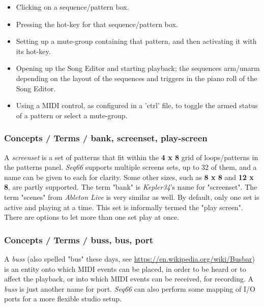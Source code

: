    \begin{itemize}
      \item Clicking on a sequence/pattern box.
      \item Pressing the hot-key for that sequence/pattern box.
      \item Setting up a mute-group containing that pattern, and then
         activating it with its hot-key.
      \item Opening up the Song Editor and starting playback; the
         sequences arm/unarm depending on the layout of the
         sequences and triggers in the piano roll of the Song Editor.
      \item Using a MIDI control, as configured in a 'ctrl' file, to
         toggle the armed status of a pattern or select a mute-group.
   \end{itemize}

\subsubsection{Concepts / Terms / bank, screenset, play-screen}
\label{subsubsec:concepts_terms_bank}

   A \textsl{screenset}
   is a set of patterns that fit within the \textbf{4 x 8}
   grid of loops/patterns in the patterns panel.
   \textsl{Seq66} supports multiple screens sets, up to 32 of them,
   and a name can be given to each for clarity.
   Some other sizes, such as \textbf{8 x 8} and \textbf{12 x 8}, are
   partly supported.
   The term "bank" is \textsl{Kepler34}'s name for "screenset".
   The term "scenes" from \textsl{Ableton Live} is very similar as well.
   By default, only one set is active and playing at a time.  This set is
   informally termed the "play screen".  There are options to let more than one
   set play at once.

\subsubsection{Concepts / Terms / buss, bus, port}
\label{subsubsec:concepts_terms_buss}

   A \textsl{buss} (also spelled "bus" these days, see
   \url{https://en.wikipedia.org/wiki/Busbar}) is an entity onto which
   MIDI events can be placed, in order to be heard or to affect the
   playback, or into which MIDI events can be received, for recording.
   A \textsl{buss} is just another name for port.
   \textsl{Seq66} can also perform some mapping of I/O ports
   for a more flexible studio setup.

